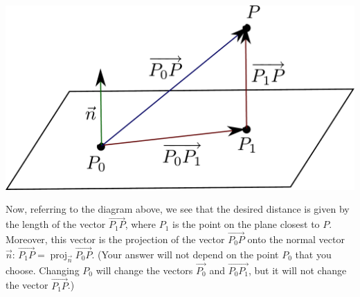 \documentclass[12pt]{article}
\DeclareMathOperator{\proj}{proj}
\begin{document}
\begin{enumerate}
\begin{multicols}{2}
\begin{center}
 \includegraphics[width=0.8\columnwidth]{WS3-4}
\end{center}
\end{multicols}
Now, referring to the diagram above, we see that the desired distance is given by the length of the vector $\overrightarrow{P_1P}$, where $P_1$ is the point on the plane closest to $P$. Moreover, this vector is the projection of the vector $\overrightarrow{P_0P}$ onto the normal vector $\vec{n}$: $\overrightarrow{P_1P} = \proj_{\vec{n}}\overrightarrow{P_0P}$. (Your answer will not depend on the point $P_0$ that you choose. Changing $P_0$ will change the vectors $\overrightarrow{P_0}$ and $\overrightarrow{P_0P_1}$, but it will not change the vector $\overrightarrow{P_1P}$.)


\end{enumerate}
\end{document}

